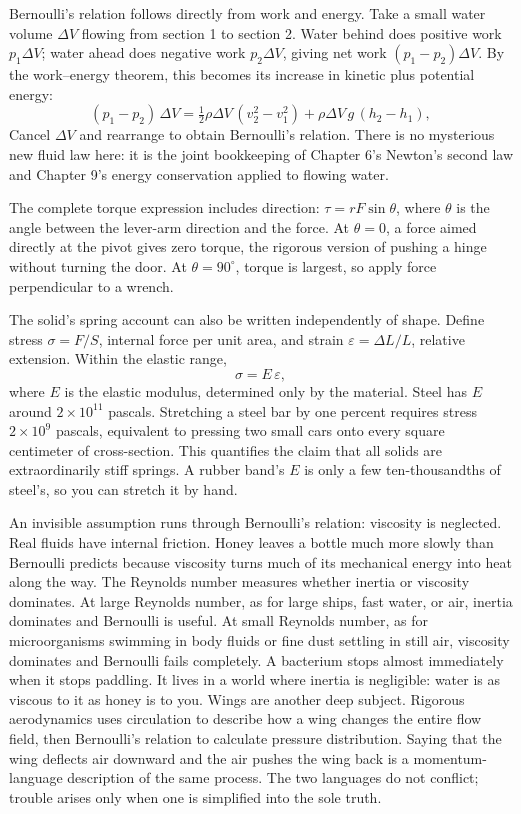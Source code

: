 \begin{mathbridge}
Bernoulli's relation follows directly from work and energy. Take a small water volume \(\Delta V\) flowing from section 1 to section 2. Water behind does positive work \(p_{1}\Delta V\); water ahead does negative work \(p_{2}\Delta V\), giving net work \((p_{1}-p_{2})\Delta V\). By the work--energy theorem, this becomes its increase in kinetic plus potential energy:
\[
  (p_{1}-p_{2})\,\Delta V
  = \tfrac{1}{2}\rho\Delta V\,(v_{2}^{2}-v_{1}^{2})
  + \rho\Delta V\,g\,(h_{2}-h_{1}),
\]
Cancel \(\Delta V\) and rearrange to obtain Bernoulli's relation. There is no mysterious new fluid law here: it is the joint bookkeeping of Chapter 6's Newton's second law and Chapter 9's energy conservation applied to flowing water.

The complete torque expression includes direction: \(\tau = rF\sin\theta\), where \(\theta\) is the angle between the lever-arm direction and the force. At \(\theta=0\), a force aimed directly at the pivot gives zero torque, the rigorous version of pushing a hinge without turning the door. At \(\theta=90^{\circ}\), torque is largest, so apply force perpendicular to a wrench.

The solid's spring account can also be written independently of shape. Define stress \(\sigma=F/S\), internal force per unit area, and strain \(\varepsilon=\Delta L/L\), relative extension. Within the elastic range,
\[
  \sigma = E\,\varepsilon,
\]
where \(E\) is the elastic modulus, determined only by the material. Steel has \(E\) around \(2\times10^{11}\) pascals. Stretching a steel bar by one percent requires stress \(2\times10^{9}\) pascals, equivalent to pressing two small cars onto every square centimeter of cross-section. This quantifies the claim that all solids are extraordinarily stiff springs. A rubber band's \(E\) is only a few ten-thousandths of steel's, so you can stretch it by hand.
\end{mathbridge}

\begin{challenge}
An invisible assumption runs through Bernoulli's relation: viscosity is neglected. Real fluids have internal friction. Honey leaves a bottle much more slowly than Bernoulli predicts because viscosity turns much of its mechanical energy into heat along the way. The Reynolds number measures whether inertia or viscosity dominates. At large Reynolds number, as for large ships, fast water, or air, inertia dominates and Bernoulli is useful. At small Reynolds number, as for microorganisms swimming in body fluids or fine dust settling in still air, viscosity dominates and Bernoulli fails completely. A bacterium stops almost immediately when it stops paddling. It lives in a world where inertia is negligible: water is as viscous to it as honey is to you. Wings are another deep subject. Rigorous aerodynamics uses circulation to describe how a wing changes the entire flow field, then Bernoulli's relation to calculate pressure distribution. Saying that the wing deflects air downward and the air pushes the wing back is a momentum-language description of the same process. The two languages do not conflict; trouble arises only when one is simplified into the sole truth.
\end{challenge}

